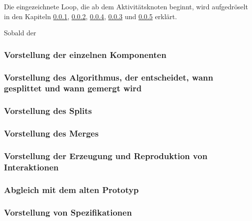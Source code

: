 Die eingezeichnete Loop, die ab dem Aktivitätsknoten  beginnt, wird aufgedröselt in den Kapiteln \ref{sec:components}, \ref{sec:core_algo_split_merge}, \ref{sec:merge_prototype}, \ref{sec:split_prototype} und \ref{sec:interactions_reproduction} erklärt.

Sobald der 

\subsubsection{Vorstellung der einzelnen Komponenten}\label{sec:components}

\subsubsection{Vorstellung des Algorithmus, der entscheidet, wann gesplittet und wann gemergt wird}\label{sec:core_algo_split_merge}

\subsubsection{Vorstellung des Splits}\label{sec:split_prototype}

\subsubsection{Vorstellung des Merges}\label{sec:merge_prototype}

\subsubsection{Vorstellung der Erzeugung und Reproduktion von Interaktionen}\label{sec:interactions_reproduction}

\subsubsection{Abgleich mit dem alten Prototyp}

\subsubsection{Vorstellung von Spezifikationen}



